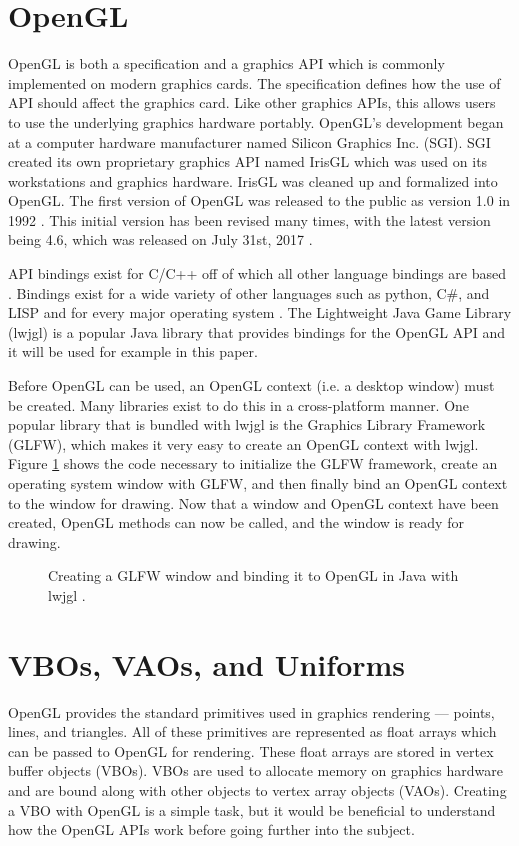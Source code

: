 \documentclass{article}
\begin{document}
\section{OpenGL}
OpenGL is both a specification and a graphics API which is commonly implemented on modern graphics cards. The specification defines how the use of API should affect the graphics card. Like other graphics APIs, this allows users to use the underlying graphics hardware portably. OpenGL's development began at a computer hardware manufacturer named Silicon Graphics Inc. (SGI). SGI created its own proprietary graphics API named IrisGL which was used on its workstations and graphics hardware. IrisGL was cleaned up and formalized into OpenGL. The first version of OpenGL was released to the public as version 1.0 in 1992 \cite{openglwiki2018}. This initial version has been revised many times, with the latest version being 4.6, which was released on July 31st, 2017 \cite{openglwiki2018}.

API bindings exist for C/C++ off of which all other language bindings are based \cite{openglwiki2018}. Bindings exist for a wide variety of other languages such as python, C\#, and LISP and for every major operating system \cite{openglwiki2018}. The Lightweight Java Game Library (lwjgl) is a popular Java library that provides bindings for the OpenGL API and it will be used for example in this paper.

Before OpenGL can be used, an OpenGL context (i.e. a desktop window) must be created. Many libraries exist to do this in a cross-platform manner. One popular library that is bundled with lwjgl is the Graphics Library Framework (GLFW), which makes it very easy to create an OpenGL context with lwjgl. Figure \ref{fig:glfw-creation} shows the code necessary to initialize the GLFW framework, create an operating system window with GLFW, and then finally bind an OpenGL context to the window for drawing. Now that a window and OpenGL context have been created, OpenGL methods can now be called, and the window is ready for drawing.

\begin{figure}[h]
	
	\caption{Creating a GLFW window and binding it to OpenGL in Java with lwjgl \cite{lwjgl}.}
	\label{fig:glfw-creation}
\end{figure}

\section{VBOs, VAOs, and Uniforms}
OpenGL provides the standard primitives used in graphics rendering --- points, lines, and triangles. All of these primitives are represented as float arrays which can be passed to OpenGL for rendering. These float arrays are stored in vertex buffer objects (VBOs). VBOs are used to allocate memory on graphics hardware and are bound along with other objects to vertex array objects (VAOs). Creating a VBO with OpenGL is a simple task, but it would be beneficial to understand how the OpenGL APIs work before going further into the subject.
\end{document}
